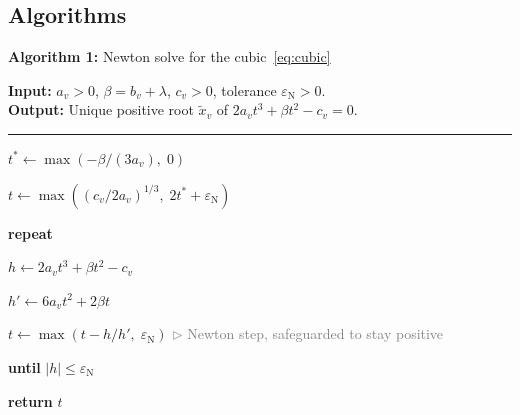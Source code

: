 \documentclass{article}
\newcommand{\kw}[1]{\textbf{#1}}
\newcommand{\cmt}[1]{\textcolor{gray}{\(\triangleright\) #1}}
\begin{document}
\newpage
\subsection*{Algorithms}

\begin{mdframed}[linewidth=0.8pt, innertopmargin=8pt, innerbottommargin=8pt,
                 innerrightmargin=10pt, innerleftmargin=10pt]
\textbf{Algorithm 1:} Newton solve for the cubic~\eqref{eq:cubic}

\medskip
\textbf{Input:} $a_v > 0$,\; $\beta = b_v + \lambda$,\; $c_v > 0$,\;
tolerance $\varepsilon_{\mathrm{N}} > 0$.\\
\textbf{Output:} Unique positive root $\tilde x_v$ of
$2a_v t^3 + \beta t^2 - c_v = 0$.

\medskip\hrule\medskip

\begin{algolist}
  \item $t^* \leftarrow \max\!\left(-\beta/(3a_v),\; 0\right)$
  \item $t \leftarrow \max\!\left((c_v / 2a_v)^{1/3},\; 2t^* + \varepsilon_{\mathrm{N}}\right)$
  \item \kw{repeat}
  \begin{algoinner}
    \item $h  \leftarrow 2a_v t^3 + \beta t^2 - c_v$
    \item $h' \leftarrow 6a_v t^2 + 2\beta t$
    \item $t  \leftarrow \max\!\left(t - h/h',\; \varepsilon_{\mathrm{N}}\right)$
      \hfill\cmt{Newton step, safeguarded to stay positive}
  \end{algoinner}
  \item \kw{until} $|h| \leq \varepsilon_{\mathrm{N}}$
  \item \textbf{return} $t$
\end{algolist}
\end{mdframed}

\bigskip
\end{document}
